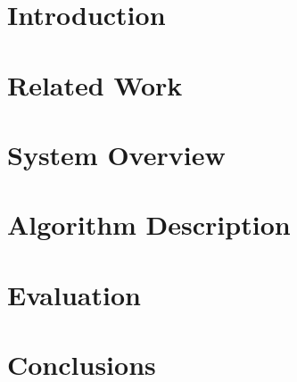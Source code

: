 \documentclass[11pt]{article}
\theoremstyle{plain}
\begin{document}
\section{Introduction}
\label{sec:intro}

\section{Related Work}
\label{sec:related}


\section{System Overview}
\label{sec:system}


\section{Algorithm Description}
\label{sec:algo}


\section{Evaluation}
\label{sec:evaluation}

\section{Conclusions}
\label{sec:conclusions}



\end{document}
